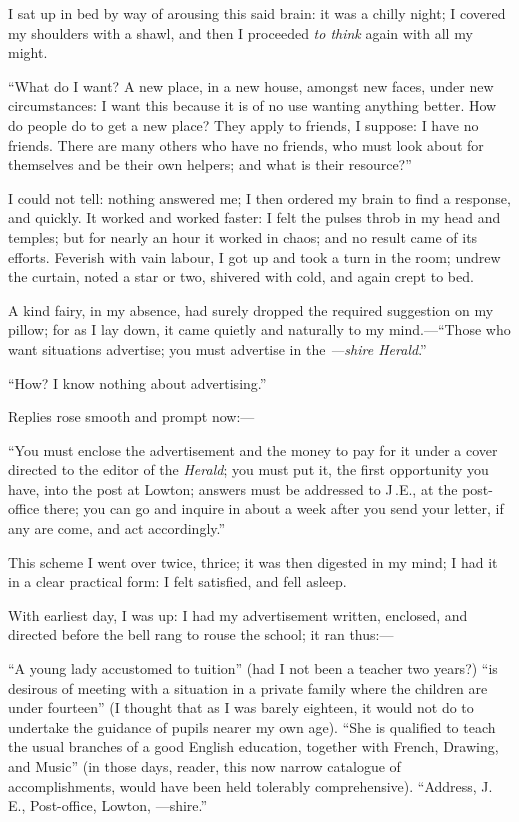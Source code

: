 I sat up in bed by way of arousing this said brain: it was a chilly
night; I covered my shoulders with a shawl, and then I proceeded
\emph{to think} again with all my might.

\enquote{What do I want? A new place, in a new house, amongst new
	faces, under new circumstances: I want this because it is of no use
	wanting anything better. How do people do to get a new place? They
	apply to friends, I suppose: I have no friends. There are many others
	who have no friends, who must look about for themselves and be their own
	helpers; and what is their resource?}

I could not tell: nothing answered me; I then ordered my brain to find a
response, and quickly. It worked and worked faster: I felt the pulses
throb in my head and temples; but for nearly an hour it worked in chaos;
and no result came of its efforts. Feverish with vain labour, I got up
and took a turn in the room; undrew the curtain, noted a star or two,
shivered with cold, and again crept to bed.

A kind fairy, in my absence, had surely dropped the required suggestion
on my pillow; for as I lay down, it came quietly and naturally to my
mind.---\enquote{Those who want situations advertise; you must advertise in the
	\emph{---shire Herald}.}

\enquote{How? I know nothing about advertising.}

Replies rose smooth and prompt now:---

\enquote{You must enclose the advertisement and the money to pay for it under a
	cover directed to the editor of the \emph{Herald}; you must put it, the
	first opportunity you have, into the post at Lowton; answers must be
	addressed to J\,.E., at the post-office there; you can go and inquire in
	about a week after you send your letter, if any are come, and act
	accordingly.}

This scheme I went over twice, thrice; it was then digested in my mind;
I had it in a clear practical form: I felt satisfied, and fell asleep.

With earliest day, I was up: I had my advertisement written, enclosed,
and directed before the bell rang to rouse the school; it ran thus:---

\enquote{A young lady accustomed to tuition} (had I not been a teacher
two years?) \enquote{is desirous of meeting with a situation in a
	private family where the children are under fourteen} (I thought that as
I was barely eighteen, it would not do to undertake the guidance of
pupils nearer my own age). \enquote{She is qualified to teach the usual
	branches of a good English education, together with French, Drawing, and
	Music} (in those days, reader, this now narrow catalogue of
accomplishments, would have been held tolerably comprehensive).
\enquote{Address, J.\,E., Post-office, Lowton, ---shire.}


